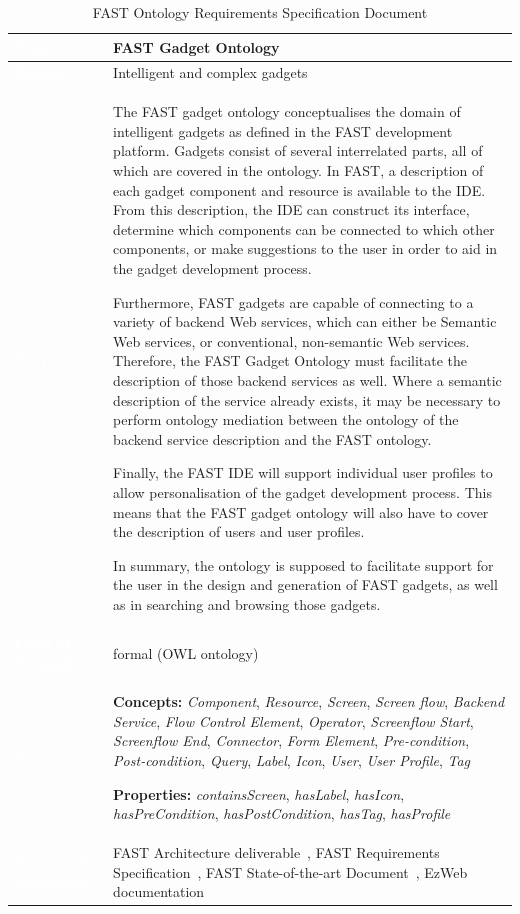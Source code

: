 \documentclass[twoside]{fast_latex}
\begin{document}
\singlespacing
\begin{small}
\begin{longtable}[t]{|>{\columncolor{fast@lightgrey}}p{3.25cm}|p{11cm}|}
\caption{\label{tab:ontology_requirements_spec}FAST Ontology Requirements Specification Document}\\
\hline
\textcolor{white}{\textbf{Name}} & \textbf{FAST Gadget Ontology} \\ \hline
\textcolor{white}{\textbf{Domain}} & Intelligent and complex gadgets \\ \hline
\textcolor{white}{\textbf{Purpose}} & The FAST gadget ontology conceptualises the domain of intelligent gadgets as defined in the FAST development platform. Gadgets consist of several interrelated parts, all of which are covered in the ontology. In FAST, a description of each gadget component and resource is available to the IDE. From this description, the IDE can construct its interface, determine which components can be connected to which other components, or make suggestions to the user in order to aid in the gadget development process.

Furthermore, FAST gadgets are capable of connecting to a variety of backend Web services, which can either be Semantic Web services, or conventional, non-semantic Web services. Therefore, the FAST Gadget Ontology must facilitate the description of those backend services as well. Where a semantic description of the service already exists, it may be necessary to perform ontology mediation between the ontology of the backend service description and the FAST ontology.

Finally, the FAST IDE will support individual user profiles to allow personalisation of the gadget development process. This means that the FAST gadget ontology will also have to cover the description of users and user profiles.

In summary, the ontology is supposed to facilitate support for the user in the design and generation of FAST gadgets, as well as in searching and browsing those gadgets.\\ \hline 
\textcolor{white}{\textbf{Level of Formality}} & formal (OWL ontology) \\ \hline
\textcolor{white}{\textbf{Scope}} & \textbf{Concepts:} \emph{Component}, \emph{Resource}, \emph{Screen}, \emph{Screen flow}, \emph{Backend Service}, \emph{Flow Control Element}, \emph{Operator}, \emph{Screenflow Start}, \emph{Screenflow End}, \emph{Connector}, \emph{Form Element}, \emph{Pre-condition}, \emph{Post-condition}, \emph{Query}, \emph{Label}, \emph{Icon}, \emph{User}, \emph{User Profile}, \emph{Tag}

\textbf{Properties:} \emph{containsScreen}, \emph{hasLabel}, \emph{hasIcon}, \emph{hasPreCondition}, \emph{hasPostCondition}, \emph{hasTag}, \emph{hasProfile}\\ \hline
\textcolor{white}{\textbf{Sources of Knowledge}} & FAST Architecture deliverable~\cite{urena2010fast_architecture}, FAST Requirements Specification~\cite{villoslada2010fast_requirements}, FAST State-of-the-art Document~\cite{urmetzer2010fast_state_of_the_art}, EzWeb documentation~\cite{lizcano2008ezweb} \\ \hline
\end{longtable}
\end{small}
\end{document}

